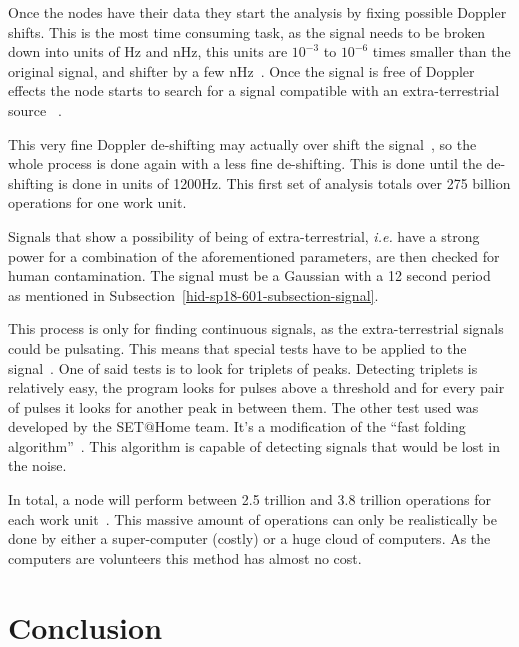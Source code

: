 Once the nodes have their data they start the analysis by fixing possible 
Doppler shifts. This is the most time consuming task, as the signal needs to be 
broken down into units of Hz and nHz, this units are $10^{-3}$ to $10^{-6}$ 
times smaller than the original signal, and shifter by a few 
nHz~\cite{hid-sp18-601-www-sathome-howworks}. Once the signal is free of Doppler
 effects the node starts to search for a signal compatible with an 
extra-terrestrial source
~\cite{hid-sp18-601-www-sathome-howworks,hid-sp18-601-paper-cocconi1959searching}.

This very fine Doppler de-shifting may actually over shift the 
signal~\cite{hid-sp18-601-www-sathome-howworks}, so the whole
process is done again with a less fine de-shifting. This is done until the 
de-shifting
is done in units of 1200Hz. This first set of analysis totals over 275 billion 
operations for one work unit.

Signals that show a possibility of being of extra-terrestrial, \textit{i.e.} 
have a strong power for a combination of the aforementioned parameters, are then 
 checked for human contamination. The signal must be 
a Gaussian with a 12 second period~\cite{hid-sp18-601-paper-anderson2002seti} as
mentioned in Subsection~\ref{hid-sp18-601-subsection-signal}.

This process is only for finding continuous signals, as the extra-terrestrial 
signals could be pulsating. This means that special tests have to be applied 
to the signal~\cite{hid-sp18-601-www-sathome-howworks}. One of said tests is 
to look for triplets of peaks. 
Detecting triplets is relatively easy, the program looks for pulses above a 
threshold and for every pair of pulses it looks for another peak in between 
them. 
 The other test
used was developed by the SET$@$Home team. It's a modification of the 
``fast folding algorithm''~\cite{hid-sp18-601-paper-korpela2001seti}.
This algorithm is capable of detecting signals that would be lost in the noise.


In total, a node will perform between 2.5 trillion and 3.8 trillion operations 
for each work unit~\cite{hid-sp18-601-www-sathome-howworks}. 
This massive amount of operations can only be realistically 
be done by either a super-computer (costly) or a huge cloud of computers. As the
 computers are volunteers this method has almost no cost. 


 
\section{Conclusion}\label{hid-sp18-601-section-conclusions}

